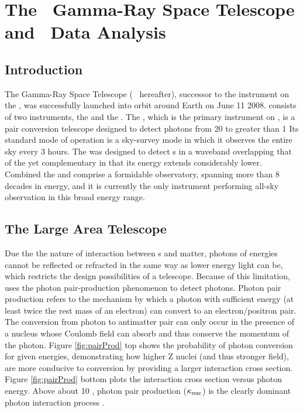 \chapter{The \Fermi ~Gamma-Ray Space Telescope and \gam ~Data Analysis}
\label{chap:FGST}

\section{\label{FGST:intro}Introduction}
The \Fermi{} Gamma-Ray Space Telescope (\Fermi{} ~hereafter), successor to the \egret{} instrument on the \cgro{}, was successfully launched into orbit around Earth on June 11 2008. \Fermi{} consists of two instruments, the \lat{} and the \gbm{}. The \lat{}, which is the primary instrument on \Fermi{}, is a pair conversion telescope designed to detect photons from 20\mev{} to greater than 1\tev{} \cite{atwood09, lat_perf, 2FHL} Its standard mode of operation is a sky-survey mode in which it observes the entire sky every 3 hours. The \gbm{} was designed to detect \grb{}s in a waveband overlapping that of the \lat{} yet complementary in that its energy extends considerably lower. Combined the \lat{} and \gbm{} comprise a formidable observatory, spanning more than 8 decades in energy, and it is currently the only instrument performing all-sky observation in this broad energy range. 

\section{\label{FGST:LAT}The Large Area Telescope}
Due the the nature of interaction between \gam{}s and matter, photons of \gam{} energies cannot be reflected or refracted in the same way as lower energy light can be, which restricts the design possibilities of a \gam{} telescope. Because of this limitation, \Fermi{} uses the photon pair-production phenomenon to detect \gam{} photons. Photon pair production refers to the mechanism by which a
photon with sufficient energy (at least twice the rest mass of an electron) can convert to an electron/positron pair. The conversion from photon to antimatter pair can only occur in the presence of a nucleus whose Coulomb field can absorb and thus conserve the momentum of the photon. Figure \ref{fig:pairProd} top shows the probability of photon conversion for given energies, demonstrating how higher Z nuclei (and thus stronger field), are more conducive to conversion by providing a larger interaction cross section. Figure \ref{fig:pairProd} bottom plots the interaction cross section versus photon energy. Above about 10 \mev{}, photon pair production (${\rm \kappa_{nuc}}$) is the clearly dominant photon interaction process \cite{Beringer12}.

